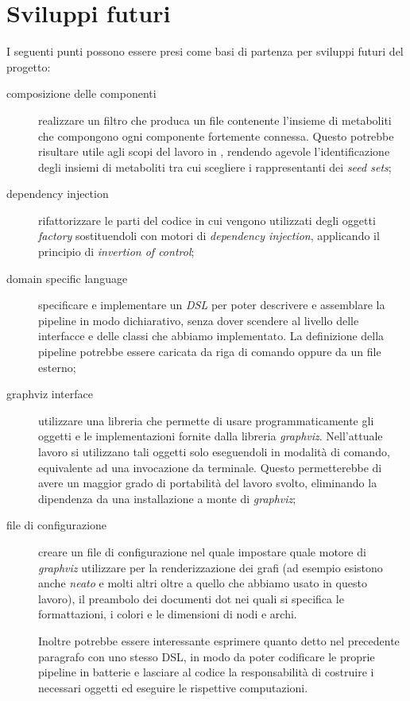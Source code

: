 \section{Sviluppi futuri}

I seguenti punti possono essere presi come basi di partenza per
sviluppi futuri del progetto:
\begin{description}
\item[composizione delle componenti] realizzare un filtro che produca
  un file contenente l'insieme di metaboliti che compongono ogni
  componente fortemente connessa. Questo potrebbe risultare utile agli
  scopi del lavoro in \cite{large-scale-reconstruction}, rendendo
  agevole l'identificazione degli insiemi di metaboliti tra cui
  scegliere i rappresentanti dei \emph{seed sets};
\item[dependency injection] rifattorizzare le parti del codice in cui
  vengono utilizzati degli oggetti \emph{factory} sostituendoli con
  motori di \emph{dependency injection}, applicando il principio di
  \emph{invertion of control};
\item[domain specific language] specificare e implementare un
  \emph{DSL} per poter descrivere e assemblare la pipeline in modo
  dichiarativo, senza dover scendere al livello delle interfacce e
  delle classi che abbiamo implementato. La definizione della pipeline
  potrebbe essere caricata da riga di comando oppure da un file
  esterno;
\item[graphviz interface] utilizzare una libreria che permette di
  usare programmaticamente gli oggetti e le implementazioni fornite
  dalla libreria \emph{graphviz}. Nell'attuale lavoro si utilizzano
  tali oggetti solo eseguendoli in modalit\`a di comando, equivalente
  ad una invocazione da terminale. Questo permetterebbe di avere un
  maggior grado di portabilit\`a del lavoro svolto, eliminando la
  dipendenza da una installazione a monte di \emph{graphviz};
\item[file di configurazione] creare un file di configurazione nel
  quale impostare quale motore di \emph{graphviz} utilizzare per la
  renderizzazione dei grafi (ad esempio esistono anche \emph{neato} e
  molti altri oltre a quello che abbiamo usato in questo lavoro), il
  preambolo dei documenti dot nei quali si specifica le formattazioni,
  i colori e le dimensioni di nodi e archi.

  Inoltre potrebbe essere interessante esprimere quanto detto nel
  precedente paragrafo con uno stesso DSL, in modo da poter codificare
  le proprie pipeline in batterie e lasciare al codice la
  responsabilit\`a di costruire i necessari oggetti ed eseguire le
  rispettive computazioni.


\end{description}
